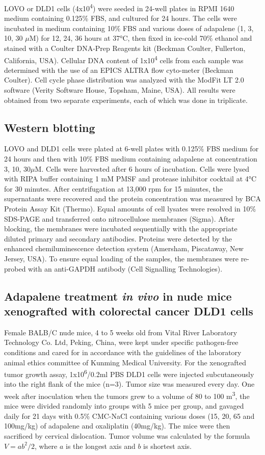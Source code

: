 LOVO or DLD1 cells (4x10\textsuperscript{4}) were seeded in 24-well plates in RPMI 1640 medium containing 0.125\% FBS, and cultured for 24 hours. The cells were incubated in medium containing 10\% FBS and various doses of adapalene (1, 3, 10, 30 $\mu$M) for 12, 24, 36 hours at 37°C, then fixed in ice-cold 70\% ethanol and stained with a Coulter DNA-Prep Reagents kit (Beckman Coulter, Fullerton, California, USA). Cellular DNA content of 1x10\textsuperscript{4} cells from each sample was determined with the use of an EPICS ALTRA flow cyto-meter (Beckman Coulter). Cell cycle phase distribution was analyzed with the ModFit LT 2.0 software (Verity Software House, Topsham, Maine, USA). All results were obtained from two separate experiments, each of which was done in triplicate.

\subsection{Western blotting}

LOVO and DLD1 cells were plated at 6-well plates with 0.125\% FBS medium for 24 hours and then with 10\% FBS medium containing adapalene at concentration 3, 10, 30$\mu$M. Cells were harvested after 6 hours of incubation. Cells were lysed with RIPA buffer containing 1 mM PMSF and protease inhibitor cocktail at 4°C for 30 minutes. After centrifugation at 13,000 rpm for 15 minutes, the supernatants were recovered and the protein concentration was measured by BCA Protein Assay Kit (Thermo). Equal amounts of cell lysates were resolved in 10\% SDS-PAGE and transferred onto nitrocellulose membranes (Sigma). After blocking, the membranes were incubated sequentially with the appropriate diluted primary and secondary antibodies. Proteins were detected by the enhanced chemiluminescence detection system (Amersham, Piscataway, New Jersey, USA). To ensure equal loading of the samples, the membranes were re-probed with an anti-GAPDH antibody (Cell Signalling Technologies).

\subsection{Adapalene treatment \textit{in vivo} in nude mice xenografted with colorectal cancer DLD1 cells}

Female BALB/C nude mice, 4 to 5 weeks old from Vital River Laboratory Technology Co. Ltd, Peking, China, were kept under specific pathogen-free conditions and cared for in accordance with the guidelines of the laboratory animal ethics committee of Kunming Medical University. For the xenografted tumor growth assay, 1x10\textsuperscript{6}/0.2ml PBS DLD1 cells were injected subcutaneously into the right flank of the mice (n=3). Tumor size was measured every day. One week after inoculation when the tumors grew to a volume of 80 to 100 m\textsuperscript{3}, the mice were divided randomly into groups with 5 mice per group, and gavaged daily for 21 days with 0.5\% CMC-NaCl containing various doses (15, 20, 65 and 100mg/kg) of adapalene and oxaliplatin (40mg/kg). The mice were then sacrificed by cervical dislocation. Tumor volume was calculated by the formula $V=ab^2/2$, where $a$ is the longest axis and $b$ is shortest axis.

